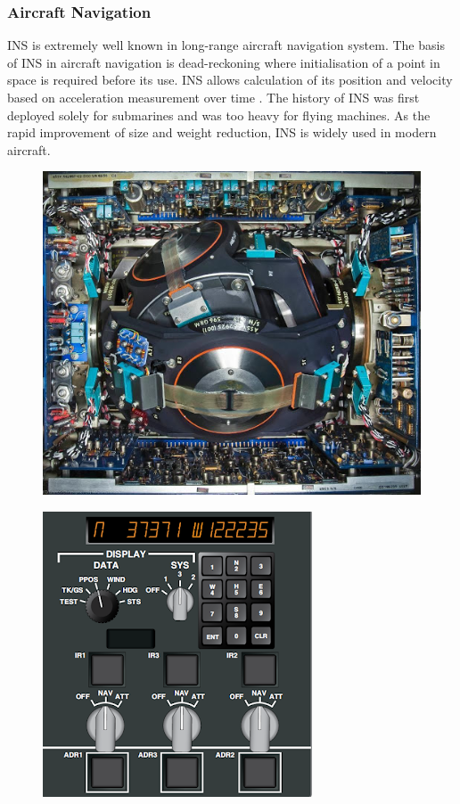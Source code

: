\subsubsection{Aircraft Navigation}
INS is extremely well known in long-range aircraft navigation system. The basis of INS in aircraft navigation is dead-reckoning where initialisation of a point in space is required before its use. INS allows calculation of its position and velocity based on acceleration measurement over time \cite{El-Sheimy2020InertialTrends}\cite{Loewy2003AircraftAvionics}. The history of INS was first deployed solely for submarines and was too heavy for flying machines. As the rapid improvement of size and weight reduction, INS is widely used in modern aircraft.


\begin{figure}[!ht]
\centering
\begin{minipage}{.48\textwidth}
  \centering
  \includegraphics[height=0.8\linewidth]{Figures/INS_Concorde.jpg}
  \label{fig:concordeINS}
\end{minipage}%
\begin{minipage}{.6\textwidth}
  \centering
  \includegraphics[height=0.8\linewidth]{Figures/INS-IRS_InterfacePanel.png}

\end{minipage}
\end{figure}
